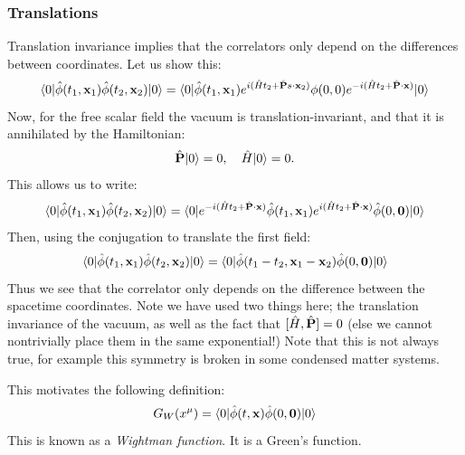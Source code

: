\subsubsection*{Translations}
Translation invariance implies that the correlators only depend on the differences between coordinates. Let us show this:
\begin{equation}
    \langle 0 \rvert\hat{\phi}(t_1, \mathbf{x}_1)\hat{\phi}(t_2, \mathbf{x}_2)\lvert 0 \rangle = \langle 0 \rvert\hat{\phi}(t_1, \mathbf{x}_1) e^{i(\hat{H}t_2 + \hat{\mathbf{P}}s\cdot\mathbf{x}_2)}\phi(0, 0)e^{-i(\hat{H}t_2 + \hat{\mathbf{P}}\cdot\mathbf{x})}\lvert 0 \rangle
\end{equation}
Now, for the free scalar field the vacuum is translation-invariant, and that it is annihilated by the Hamiltonian:
\begin{equation}
    \hat{\mathbf{P}}\lvert 0 \rangle = 0, \quad \hat{H}\lvert 0 \rangle = 0.
\end{equation}
This allows us to write:
\begin{equation}
    \langle 0 \rvert\hat{\phi}(t_1, \mathbf{x}_1)\hat{\phi}(t_2, \mathbf{x}_2)\lvert 0 \rangle = \langle 0 \rvert e^{-i(\hat{H}t_2 + \hat{\mathbf{P}}\cdot\mathbf{x})} \hat{\phi}(t_1, \mathbf{x}_1)e^{i(\hat{H}t_2 + \hat{\mathbf{P}}\cdot\mathbf{x})}\hat{\phi}(0, \mathbf{0})\lvert 0 \rangle
\end{equation}
Then, using the conjugation to translate the first field:
\begin{equation}
    \langle 0 \rvert\hat{\phi}(t_1, \mathbf{x}_1)\hat{\phi}(t_2, \mathbf{x}_2)\lvert 0 \rangle = \langle 0 \rvert\hat{\phi}(t_1 - t_2, \mathbf{x}_1 - \mathbf{x}_2)\hat{\phi}(0, \mathbf{0})\lvert 0 \rangle
\end{equation}
Thus we see that the correlator only depends on the difference between the spacetime coordinates. Note we have used two things here; the translation invariance of the vacuum, as well as the fact that $[\hat{H}, \hat{\mathbf{P}}] = 0$ (else we cannot nontrivially place them in the same exponential!) Note that this is not always true, for example this symmetry is broken in some condensed matter systems.

This motivates the following definition:
\begin{equation}
    G_W(x^\mu) = \langle 0 \rvert\hat{\phi}(t, \mathbf{x})\hat{\phi}(0, \mathbf{0})\lvert 0 \rangle
\end{equation}
This is known as a \emph{Wightman function}. It is a Green's function.

